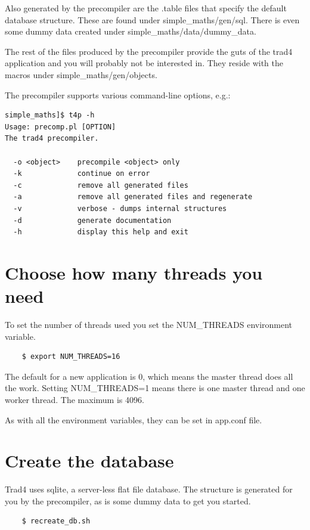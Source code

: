 \documentclass{report}
\begin{document}
Also generated by the precompiler are the .table files that specify the default database structure. These are found under simple_maths/gen/sql. There is even some dummy data created under simple_maths/data/dummy_data.

The rest of the files produced by the precompiler provide the guts of the trad4 application and you will probably not be interested in. They reside with the macros under simple_maths/gen/objects.

The precompiler supports various command-line options, e.g.:

\begin{verbatim}
simple_maths]$ t4p -h
Usage: precomp.pl [OPTION]
The trad4 precompiler.

  -o <object>    precompile <object> only
  -k             continue on error
  -c             remove all generated files
  -a             remove all generated files and regenerate
  -v             verbose - dumps internal structures
  -d             generate documentation
  -h             display this help and exit
\end{verbatim}

\section{Choose how many threads you need}

To set the number of threads used you set the NUM_THREADS environment variable.

\begin{verbatim}
    $ export NUM_THREADS=16
\end{verbatim}

The default for a new application is 0, which means the master thread does all the work. Setting NUM_THREADS=1 means there is one master thread and one worker thread. The maximum is 4096.

As with all the environment variables, they can be set in app.conf file.


\section{Create the database}

Trad4 uses sqlite, a server-less flat file database. The structure is generated for you by the precompiler, as is some dummy data to get you started.

\begin{verbatim}
    $ recreate_db.sh
\end{verbatim}
\end{document}
